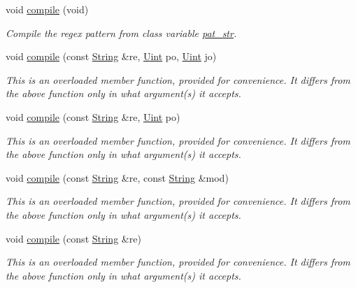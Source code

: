 \begin{DoxyCompactItemize}
void \hyperlink{classjpcre2_1_1Regex_aad1d5ef1e87f762f68a587eec4022e69}{compile} (void)
\begin{DoxyCompactList}\small\item\em Compile the regex pattern from class variable \hyperlink{classjpcre2_1_1Regex_a0bceb85b6dbba355b56b5cc312214435}{pat\+\_\+str}. \end{DoxyCompactList}\item 
void \hyperlink{classjpcre2_1_1Regex_a4640915bc907aa3b80da543f1eb7e74f}{compile} (const \hyperlink{namespacejpcre2_a91f03070152fb228bc116c5a737f1d16}{String} \&re, \hyperlink{namespacejpcre2_a078242d38221a13fb3543b9edd78c099}{Uint} po, \hyperlink{namespacejpcre2_a078242d38221a13fb3543b9edd78c099}{Uint} jo)
\begin{DoxyCompactList}\small\item\em This is an overloaded member function, provided for convenience. It differs from the above function only in what argument(s) it accepts. \end{DoxyCompactList}\item 
void \hyperlink{classjpcre2_1_1Regex_a01394dcb222c4d442cabbffb4bcf570a}{compile} (const \hyperlink{namespacejpcre2_a91f03070152fb228bc116c5a737f1d16}{String} \&re, \hyperlink{namespacejpcre2_a078242d38221a13fb3543b9edd78c099}{Uint} po)
\begin{DoxyCompactList}\small\item\em This is an overloaded member function, provided for convenience. It differs from the above function only in what argument(s) it accepts. \end{DoxyCompactList}\item 
void \hyperlink{classjpcre2_1_1Regex_acd49e856009160c622e90b81b6557d8d}{compile} (const \hyperlink{namespacejpcre2_a91f03070152fb228bc116c5a737f1d16}{String} \&re, const \hyperlink{namespacejpcre2_a91f03070152fb228bc116c5a737f1d16}{String} \&mod)
\begin{DoxyCompactList}\small\item\em This is an overloaded member function, provided for convenience. It differs from the above function only in what argument(s) it accepts. \end{DoxyCompactList}\item 
void \hyperlink{classjpcre2_1_1Regex_a81687ca434654cae776c2854c3618de0}{compile} (const \hyperlink{namespacejpcre2_a91f03070152fb228bc116c5a737f1d16}{String} \&re)
\begin{DoxyCompactList}\small\item\em This is an overloaded member function, provided for convenience. It differs from the above function only in what argument(s) it accepts. \end{DoxyCompactList}\item 

\end{DoxyCompactItemize}
